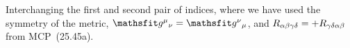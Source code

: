 \documentclass[11pt]{article}
\begin{document}
{	Interchanging the first and second pair of indices,
	where we have used the symmetry of the metric, $\fv{\sg}{\mu}{\nu} = \fv{\sg}{\nu}{\mu}$, and $R_{\alpha \beta \gamma \delta} = +R_{\gamma \delta \alpha \beta}$ from MCP~(25.45a).

}
\end{document}
